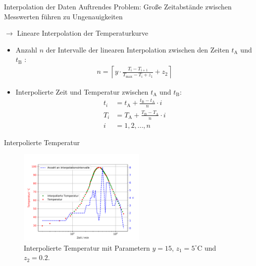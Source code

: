 \documentclass[aspectratio=1610, 9pt]{beamer}
\begin{document}
\begin{frame}{Interpolation der Daten}
  Auftrendes Problem: Große Zeitabstände zwischen Messwerten führen zu Ungenauigkeiten
  \medskip

  $\rightarrow$ Lineare Interpolation der Temperaturkurve
  \medskip
  \begin{itemize}
    \item Anzahl $n$ der Intervalle der linearen Interpolation zwischen den Zeiten $t_{\mathrm{A}}$ und $t_{\mathrm{B}}$ :
    \begin{align*}
      n = \left\lceil y \cdot \frac{T_{\mathrm{i}}-T_{\mathrm{i+1}}}{T_{\mathrm{max}}-T_{\mathrm{i}}+ z_1}+z_2 \right\rceil
    \end{align*}

    \item Interpolierte Zeit und Temperatur zwischen $t_{\mathrm{A}}$ und $t_{\mathrm{B}}$:
    \begin{align*}
      t_i &= t_{\mathrm{A}} +  \frac{t_{\mathrm{B}}-t_{\mathrm{A}}}{n} \cdot i \\
      T_i &= T_{\mathrm{A}} +  \frac{T_{\mathrm{B}}-T_{\mathrm{A}}}{n} \cdot i \\
      i &= 1, 2, ..., n
    \end{align*}
  \end{itemize}
\end{frame}

\begin{frame}{Interpolierte Temperatur}
  \begin{figure}
      \includegraphics[width=0.55\textwidth]{images/interpolation_steps.PDF}
  \caption{Interpolierte Temperatur mit Parametern $y=15$, $z_1=5^\circ$C und $z_2 = 0.2$.}
  \end{figure}
\end{frame}
\end{document}
